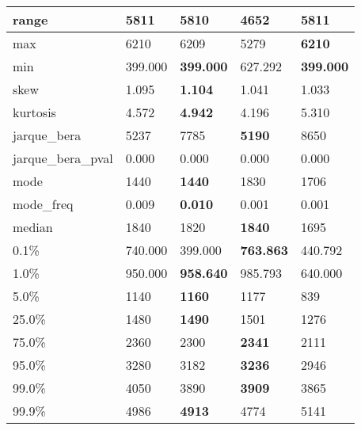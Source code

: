 \begin{table}[H]
\begin{tabular}{|l|m{10em}|m{10em}|m{10em}|m{10em}|}
\hline range & 5811 & 5810 & \cellcolor[rgb]{0.9, 0.54, 0.52} 4652 & \bfseries 5811 \\
\hline max & 6210 & 6209 & \cellcolor[rgb]{0.9, 0.54, 0.52} 5279 & \bfseries 6210 \\
\hline min & 399.000 & \bfseries 399.000 & \cellcolor[rgb]{0.9, 0.54, 0.52} 627.292 & \bfseries 399.000 \\
\hline skew & 1.095 & \bfseries 1.104 & 1.041 & \cellcolor[rgb]{0.9, 0.54, 0.52} 1.033 \\
\hline kurtosis & 4.572 & \bfseries 4.942 & 4.196 & \cellcolor[rgb]{0.9, 0.54, 0.52} 5.310 \\
\hline jarque\_bera & 5237 & 7785 & \bfseries 5190 & \cellcolor[rgb]{0.9, 0.54, 0.52} 8650 \\
\hline jarque\_bera\_pval & 0.000 & 0.000 & 0.000 & 0.000 \\
\hline mode & 1440 & \bfseries 1440 & \cellcolor[rgb]{0.9, 0.54, 0.52} 1830 & 1706 \\
\hline mode\_freq & 0.009 & \bfseries 0.010 & \cellcolor[rgb]{0.9, 0.54, 0.52} 0.001 & 0.001 \\
\hline median & 1840 & 1820 & \bfseries 1840 & \cellcolor[rgb]{0.9, 0.54, 0.52} 1695 \\
\hline 0.1\% & 740.000 & \cellcolor[rgb]{0.9, 0.54, 0.52} 399.000 & \bfseries 763.863 & 440.792 \\
\hline 1.0\% & 950.000 & \bfseries 958.640 & 985.793 & \cellcolor[rgb]{0.9, 0.54, 0.52} 640.000 \\
\hline 5.0\% & 1140 & \bfseries 1160 & 1177 & \cellcolor[rgb]{0.9, 0.54, 0.52} 839 \\
\hline 25.0\% & 1480 & \bfseries 1490 & 1501 & \cellcolor[rgb]{0.9, 0.54, 0.52} 1276 \\
\hline 75.0\% & 2360 & 2300 & \bfseries 2341 & \cellcolor[rgb]{0.9, 0.54, 0.52} 2111 \\
\hline 95.0\% & 3280 & 3182 & \bfseries 3236 & \cellcolor[rgb]{0.9, 0.54, 0.52} 2946 \\
\hline 99.0\% & 4050 & 3890 & \bfseries 3909 & \cellcolor[rgb]{0.9, 0.54, 0.52} 3865 \\
\hline 99.9\% & 4986 & \bfseries 4913 & \cellcolor[rgb]{0.9, 0.54, 0.52} 4774 & 5141 \\
\hline
\end{tabular}
\end{table}
